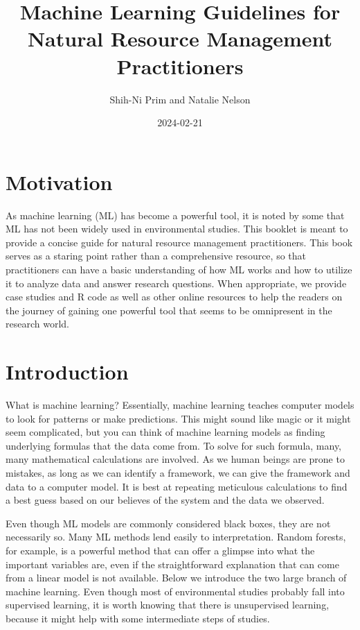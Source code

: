 \documentclass[
]{book}
\title{Machine Learning Guidelines for Natural Resource Management Practitioners}
\author{Shih-Ni Prim and Natalie Nelson}
\date{2024-02-21}
\begin{document}
\maketitle

{
\setcounter{tocdepth}{1}
\tableofcontents
}
\hypertarget{motivation}{%
\chapter{Motivation}\label{motivation}}

As machine learning (ML) has become a powerful tool, it is noted by some that ML has not been widely used in environmental studies. This booklet is meant to provide a concise guide for natural resource management practitioners. This book serves as a staring point rather than a comprehensive resource, so that practitioners can have a basic understanding of how ML works and how to utilize it to analyze data and answer research questions. When appropriate, we provide case studies and R code as well as other online resources to help the readers on the journey of gaining one powerful tool that seems to be omnipresent in the research world.

\hypertarget{intro}{%
\chapter{Introduction}\label{intro}}

What is machine learning? Essentially, machine learning teaches computer models to look for patterns or make predictions. This might sound like magic or it might seem complicated, but you can think of machine learning models as finding underlying formulas that the data come from. To solve for such formula, many, many mathematical calculations are involved. As we human beings are prone to mistakes, as long as we can identify a framework, we can give the framework and data to a computer model. It is best at repeating meticulous calculations to find a best guess based on our believes of the system and the data we observed.

Even though ML models are commonly considered black boxes, they are not necessarily so. Many ML methods lend easily to interpretation. Random forests, for example, is a powerful method that can offer a glimpse into what the important variables are, even if the straightforward explanation that can come from a linear model is not available. Below we introduce the two large branch of machine learning. Even though most of environmental studies probably fall into supervised learning, it is worth knowing that there is unsupervised learning, because it might help with some intermediate steps of studies.
\end{document}

